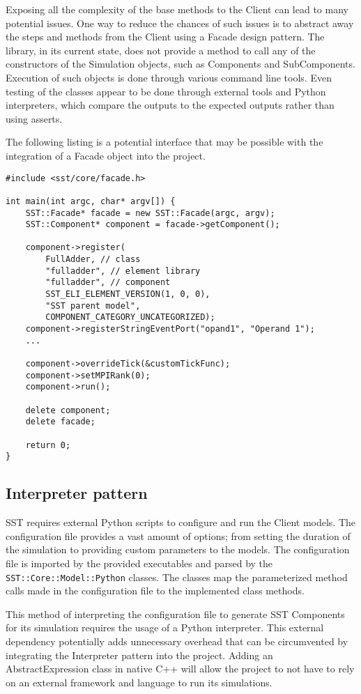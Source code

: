 Exposing all the complexity of the base methods to the Client can lead to many potential issues. One way to reduce the chances of such issues is to abstract away the steps and methods from the Client using a Facade design pattern. The library, in its current state, does not provide a method to call any of the constructors of the Simulation objects, such as Components and SubComponents. Execution of such objects is done through various command line tools. Even testing of the classes appear to be done through external tools and Python interpreters, which compare the outputs to the expected outputs rather than using asserts.

The following listing is a potential interface that may be possible with the integration of a Facade object into the project.

\begin{lstlisting}[style=customC++]
#include <sst/core/facade.h>

int main(int argc, char* argv[]) {
    SST::Facade* facade = new SST::Facade(argc, argv);
    SST::Component* component = facade->getComponent();

    component->register(
        FullAdder, // class
        "fulladder", // element library
        "fulladder", // component
        SST_ELI_ELEMENT_VERSION(1, 0, 0),
        "SST parent model",
        COMPONENT_CATEGORY_UNCATEGORIZED);
    component->registerStringEventPort("opand1", "Operand 1");
    ...

    component->overrideTick(&customTickFunc);
    component->setMPIRank(0);
    component->run();

    delete component;
    delete facade;

    return 0;
}
\end{lstlisting}

\subsection{Interpreter pattern}
SST requires external Python scripts to configure and run the Client models. The configuration file provides a vast amount of options; from setting the duration of the simulation to providing custom parameters to the models. The configuration file is imported by the provided executables and parsed by the \texttt{SST::Core::Model::Python} classes. The classes map the parameterized method calls made in the configuration file to the implemented class methods.

This method of interpreting the configuration file to generate SST Components for its simulation requires the usage of a Python interpreter. This external dependency potentially adds unnecessary overhead that can be circumvented by integrating the Interpreter pattern into the project. Adding an AbstractExpression class in native C++ will allow the project to not have to rely on an external framework and language to run its simulations.


